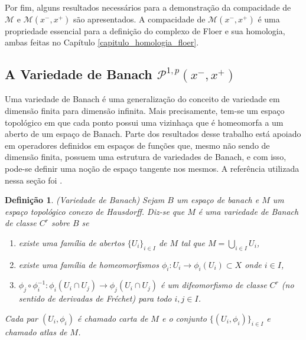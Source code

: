 \documentclass[12pt]{book}
\newtheorem{definicao}[teorema]{Definição}
\newcommand{\caminhosexponenciaisconectantes}[2]{\mathcal{P}^{1,p}(#1, #2)}
\newcommand{\caminhosexponenciaisconectantespadrao}{\caminhosexponenciaisconectantes{x^{-}}{x^{+}}}
\newcommand{\energiafinitaM}{\mathcal{M}}
\newcommand{\energiafinitaMconectante}{\energiafinitaM(x^{-}, x^{+})}
\begin{document}
	Por fim, alguns resultados necessários para a demonstração da compacidade de $\energiafinitaM$ e $\energiafinitaMconectante$ são apresentados. A compacidade de $\energiafinitaMconectante$ é uma propriedade essencial para a definição do complexo de Floer e sua homologia, ambas feitas no Capítulo \ref{capitulo_homologia_floer}.
	
	\subsection{A Variedade de Banach $\caminhosexponenciaisconectantespadrao$}\label{secao_variedade_banach_P}
	
	Uma variedade de Banach é uma generalização do conceito de variedade em dimensão finita para dimensão infinita. Mais precisamente, tem-se um espaço topológico em que cada ponto possui uma vizinhaça que é homeomorfa a um aberto de um espaço de Banach. Parte dos resultados desse trabalho está apoiado em operadores definidos em espaços de funções que, mesmo não sendo de dimensão finita, possuem uma estrutura de variedades de Banach, e com isso, pode-se definir uma noção de espaço tangente nos mesmos. A referência utilizada nessa seção foi \cite{chang_morse_infinito}.
	
	\begin{definicao}
		(Variedade de Banach) Sejam $B$ um espaço de banach e $M$ um espaço topológico conexo de Hausdorff. Diz-se que $M$ é uma variedade de Banach de classe $C^{r}$ sobre $B$ se
		
		\begin{enumerate}
			\item existe uma família de abertos $\{U_{i}\}_{i\in I}$ de $M$ tal que $M=\bigcup_{i\in I}U_{i}$,
			
			\item existe uma família de homeomorfismos $ \phi_{i}:U_{i}\to \phi_{i}(U_{i})\subset X $ onde $i\in I$,
			
			\item $\phi_{j}\circ \phi_{i}^{-1}: \phi_{i}(U_{i}\cap U_{j}) \to \phi_{j}(U_{i}\cap U_{j}) $ é um difeomorfismo de classe $C^{r}$ (no sentido de derivadas de Fréchet) para todo $i,j \in I$.
		\end{enumerate}
		
		Cada par $(U_{i}, \phi_{i})$ é chamado carta de $M$ e  o conjunto $\{(U_{i}, \phi_{i})\}_{i\in I}$ e chamado atlas de $M$.
	\end{definicao}
	
\end{document}
